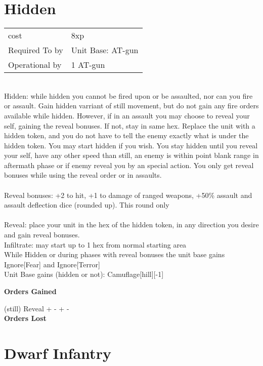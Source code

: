 \section{ Hidden }

\begin{tabular}{ll}
  cost & 8xp\\
  Required To by & Unit Base: AT-gun\\
  Operational by & 1 AT-gun\\

\end{tabular}
\ \\
Hidden: while hidden you cannot be fired upon or be assaulted, nor can you fire or assault. Gain hidden varriant of still movement,  but do not gain any fire orders available while hidden. However, if in an assault you may choose to reveal your self, gaining the reveal bonuses. If not, stay in same hex. Replace the unit with a hidden token, and you do not have to tell the enemy exactly what is under the hidden token. You may start hidden if you wish. You stay hidden until you reveal your self, have any other speed than still, an enemy is within point blank range in aftermath phase or if enemy reveal you by an special action. You only get reveal bonuses while using the reveal order or in assaults. \\ \ \\ Reveal bonuses: +2 to hit, +1 to damage of ranged weapons, +50\% assault and assault deflection dice (rounded up). This round only \\ \ \\ Reveal: place your unit in the hex of the hidden token, in any direction you desire and gain reveal bonuses.\\ Infiltrate: may start up to 1 hex from normal starting area\\ While Hidden or during phases with reveal bonuses the unit base gains Ignore[Fear] and Ignore[Terror] \\ Unit Base gains (hidden or not): Camuflage[hill][-1]

{\bf Orders Gained    }

\noindent (still) Reveal + - + - \\

{\bf Orders Lost }

\noindent 
\pagebreak

\section{ Dwarf Infantry }

